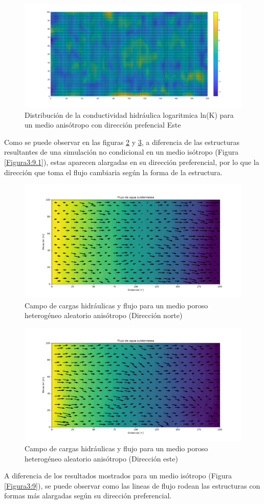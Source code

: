  \begin{figure}[H]
\centering
\includegraphics[scale=0.45]{Figura39}
\caption{ Distribución de la conductividad hidráulica logaritmica ln(K) para un medio anisótropo con dirección prefencial Este }
\label{Figura3:11}
\end{figure} 

Como se puede observar en las figuras \ref{Figura3:10} y \ref{Figura3:11}, a diferencia de las estructuras resultantes de una simulación no condicional en un medio isótropo (Figura \ref{Figura3:9.1}), estas aparecen alargadas en su dirección preferencial, por lo que la dirección que toma el flujo cambiaria según la forma de la estructura.

\begin{figure}[H]
\centering
\includegraphics[scale=0.50]{Figura_40}
\caption{ Campo de cargas hidráulicas y flujo para un medio poroso heterogéneo aleatorio anisótropo (Dirección norte) }
\label{Figura3:10}
\end{figure}

 \begin{figure}[H]
\centering
\includegraphics[scale=0.50]{Figura_41}
\caption{ Campo de cargas hidráulicas y flujo para un medio poroso heterogéneo aleatorio anisótropo (Dirección este) }
\label{Figura3:11}
\end{figure} 

A diferencia de los resultados mostrados para un medio isótropo (Figura \ref{Figura3:9}), se puede observar como las lineas de flujo rodean las estructuras con formas más alargadas según su dirección preferencial. 
 
\newpage

